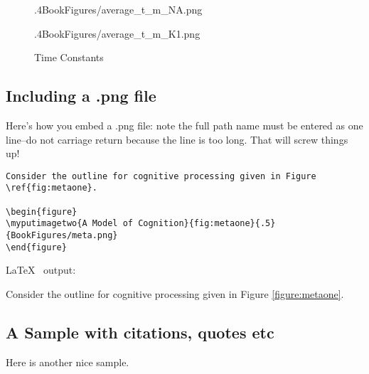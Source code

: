 \documentclass[11pt]{SelfArxOneColBMN}
\newcommand{\goodgap}{
  \hspace{\subfigtopskip}
  \hspace{\subfigbottomskip}}
\begin{document}
\begin{figure}[h]
\begin{center}
%
                            {.4}{BookFigures/average_t_m_NA.png}
\goodgap
{}%
                            {.4}{BookFigures/average_t_m_K1.png}
\caption{Time Constants}
\label{fig:iontimeconstants}
\end{center}
\end{figure}

\subsection{Including a .png file}

\noindent
Here's how you embed a .png file: note the full path name must be entered as one line--do not 
carriage return because the line is too long.  That will screw things
up!

\singlespacing
{}
\begin{lstlisting}
Consider the outline for cognitive processing given in Figure \ref{fig:metaone}.

\begin{figure}
\myputimagetwo{A Model of Cognition}{fig:metaone}{.5}{BookFigures/meta.png}
\end{figure}
\end{lstlisting}
\onehalfspacing
\lstset{fancyvrb=false}

\noindent
\LaTeX~ output:

Consider the outline for cognitive processing given in Figure \ref{figure:metaone}.

\begin{figure}
\end{figure}

\subsection{A Sample with citations, quotes etc}

Here is another nice sample.
\end{document}
